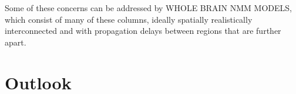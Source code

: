 Some of these concerns can be addressed by WHOLE BRAIN NMM MODELS,
which consist of many of these columns, ideally spatially realistically interconnected and with propagation delays
between regions that are further apart.




\section{Outlook}
